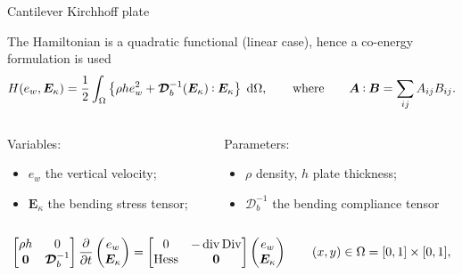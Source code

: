 \documentclass[aspectratio=169]{ISAE-Beamer}
\DeclareMathOperator*{\Div}{Div}
\renewcommand{\div}{\operatorname{div}}
\DeclareMathOperator*{\Hess}{Hess}
\newcommand{\where}{\qquad \text{where} \qquad}
\newcommand{\energy}[1]{\frac{1}{2} \int_{\Omega} \left\{ #1 \right\} \d\Omega}
\def\onedot{$\mathsurround0pt\ldotp$}
\def\cddot{%
	\mathbin{\vcenter{\baselineskip.67ex
			\hbox{\onedot}\hbox{\onedot}}%
}}
\begin{document}
\begin{frame}{Cantilever Kirchhoff plate}
		
The Hamiltonian is a  quadratic functional (linear case), hence a co-energy formulation is used
\begin{equation*}
	H(e_w, \bm{E}_\kappa) = \energy{\rho h e_w^2 + \bm{\mathcal{D}}_b^{-1}(\bm{E}_\kappa) \cddot \bm{E}_\kappa}, \where \bm{A} \cddot \bm{B} = \sum_{ij} A_{ij}B_{ij}.
\end{equation*}


\begin{columns}
	
	\begin{column}{.45\textwidth}
		Variables: 
		\begin{itemize}
			\item $e_w$ the vertical velocity;
			\item $\bm{E}_\kappa$ the bending stress tensor;
		\end{itemize}
	\end{column}
	
	\begin{column}{.45\textwidth}
		Parameters:
		\begin{itemize}
			\item $\rho$ density, $h$ plate thickness;
			\item $\bm{\mathcal{D}}_b^{-1}$ the bending compliance tensor 
		\end{itemize}
	\end{column}
	
\end{columns}

\vspace{.5cm}
	
\begin{equation*}
	\begin{bmatrix}
		\rho h & 0 \\ 
		\bm{0} & \bm{\mathcal{D}}_b^{-1} \\
	\end{bmatrix}
	\diffp{}{t}
	\begin{pmatrix}
		e_w \\ \bm{E}_\kappa \\
	\end{pmatrix} = 
	\begin{bmatrix}
		0 & -\div\Div \\ 
		\Hess & \bm{0} \\
	\end{bmatrix}
	\begin{pmatrix}
		e_w \\ \bm{E}_\kappa \\
	\end{pmatrix} \qquad (x, y) \in \Omega = [0, 1]\times[0,1],
\end{equation*}
	
\end{frame}
\end{document}
